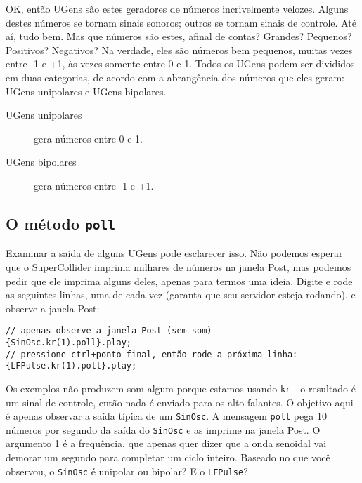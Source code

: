 OK, então UGens são estes geradores de números incrivelmente velozes. Alguns destes números se tornam sinais sonoros; outros se tornam sinais de controle. Até aí, tudo bem. Mas que números são estes, afinal de contas? Grandes? Pequenos? Positivos? Negativos? Na verdade, eles são números bem pequenos, muitas vezes entre -1 e +1, às vezes somente entre 0 e 1. Todos os UGens podem ser divididos em duas categorias, de acordo com a abrangência dos números que eles geram: UGens unipolares e UGens bipolares.

\begin{description}
\item[UGens unipolares] gera números entre 0 e 1.
\item[UGens bipolares] gera números entre -1 e +1.

\end{description}

\subsection{O método \texttt{poll}}

Examinar a saída de alguns UGens pode esclarecer isso. Não podemos esperar que o SuperCollider imprima milhares de números na janela Post, mas podemos pedir que ele imprima alguns deles, apenas para termos uma ideia. Digite e rode as seguintes linhas, uma de cada vez (garanta que seu servidor esteja rodando), e observe a janela Post: 

\begin{lstlisting}[style=SuperCollider-IDE, basicstyle=\scttfamily\footnotesize]
// apenas observe a janela Post (sem som)
{SinOsc.kr(1).poll}.play;
// pressione ctrl+ponto final, então rode a próxima linha:
{LFPulse.kr(1).poll}.play;
\end{lstlisting}

Os exemplos não produzem som algum porque estamos usando \texttt{kr}—o resultado é um sinal de controle, então nada é enviado para os alto-falantes. O objetivo aqui é apenas observar a saída típica de um \texttt{SinOsc}. A mensagem \texttt{poll} pega 10 números por segundo da saída do \texttt{SinOsc}
e as imprime na janela Post. O argumento 1 é a frequência, que apenas quer dizer que a onda senoidal vai demorar um segundo para completar um ciclo inteiro. Baseado no que você observou, o \texttt{SinOsc} é unipolar ou bipolar? E o \texttt{LFPulse}?

